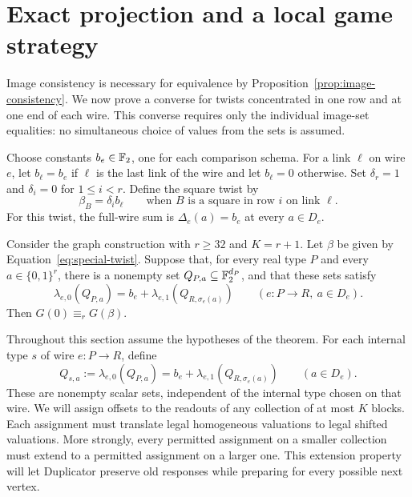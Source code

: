 \section{Exact projection and a local game strategy}
\label{sec:projection}

Image consistency is necessary for equivalence by
Proposition~\ref{prop:image-consistency}. We now prove a converse for
twists concentrated in one row and at one end of each wire. This converse
requires only the individual image-set equalities: no simultaneous choice
of values from the sets is assumed.

Choose constants $b_e\in\mathbb F_2$, one for each comparison schema. For a link
$\ell$ on wire $e$, let $b_\ell=b_e$ if $\ell$ is the last link of the
wire and let $b_\ell=0$ otherwise. Set $\delta_r=1$ and $\delta_i=0$
for $1\leq i<r$. Define the square twist by
\begin{equation}
  \beta_B=\delta_i b_\ell
  \qquad\text{when $B$ is a square in row $i$ on link $\ell$.}
  \label{eq:special-twist}
\end{equation}
For this twist, the full-wire sum is $\Delta_e(a)=b_e$ at every
$a\in D_e$.

\begin{theorem}
\label{thm:special-twist}
Consider the graph construction with $r\geq32$ and $K=r+1$.
Let $\beta$ be given by Equation~\eqref{eq:special-twist}. Suppose that,
for every real type $P$ and every $a\in\{0,1\}^r$, there is a nonempty
set $Q_{P,a}\subseteq\mathbb F_2^{d_P}$, and that these sets satisfy
\begin{equation}
  \lambda_{e,0}(Q_{P,a})
  =b_e+\lambda_{e,1}(Q_{R,\sigma_e(a)})
  \qquad(e:P\longrightarrow R,\ a\in D_e).
  \label{eq:special-images}
\end{equation}
Then $G(0)\equiv_r G(\beta)$.
\end{theorem}

Throughout this section assume the hypotheses of the theorem. For each
internal type $s$ of wire $e:P\to R$, define
\begin{equation}
  Q_{s,a}:=\lambda_{e,0}(Q_{P,a})
       =b_e+\lambda_{e,1}(Q_{R,\sigma_e(a)})
       \qquad(a\in D_e).
  \label{eq:internal-image-set}
\end{equation}
These are nonempty scalar sets, independent of the internal type chosen
on that wire. We will assign offsets to the readouts of any collection
of at most $K$ blocks. Each assignment must translate legal homogeneous
valuations to legal shifted valuations. More strongly, every permitted
assignment on a smaller collection must extend to a permitted assignment
on a larger one. This extension property will let Duplicator preserve
old responses while preparing for every possible next vertex.

